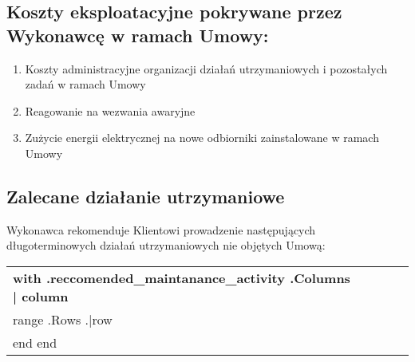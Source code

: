 \subsection{Koszty eksploatacyjne pokrywane przez Wykonawcę w ramach Umowy:}
\begin{enumerate}
	\item Koszty administracyjne organizacji działań utrzymaniowych i pozostałych zadań w ramach Umowy
	\item Reagowanie na wezwania awaryjne
	\item Zużycie energii elektrycznej na nowe odbiorniki zainstalowane w ramach Umowy
\end{enumerate}


\subsection{Zalecane działanie utrzymaniowe}

Wykonawca rekomenduje Klientowi prowadzenie następujących długoterminowych działań utrzymaniowych nie objętych Umową:


\begin{center}
\begin{tabu}{|X[3]|X|X|X|X|} \tabucline{} \rowfont[c]\bfseries
{{with .reccomended_maintanance_activity}} %
	{{.Columns | column}} \\\tabucline{}
	{{range .Rows}} %
	{{.|row}} \\\tabucline{}
	{{end}}
{{end}}
\end{tabu}
\end{center}
